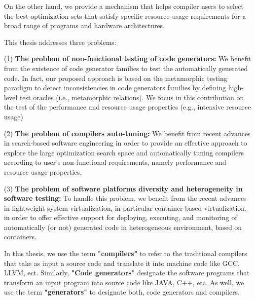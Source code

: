On the other hand, we provide a mechanism that helps compiler users to select the best optimization sets that satisfy specific resource usage requirements for a broad range of programs and hardware architectures.

This thesis addresses three problems: 
	
	(1) \textbf{The problem of non-functional testing of code generators:} We benefit from the existence of code generator families to test the automatically generated code. In fact, our proposed approach is based on the metamorphic testing paradigm to detect inconsistencies in code generators families by defining high-level test oracles (i.e., metamorphic relations). We focus in this contribution on the test of the performance and resource usage properties (e.g., intensive resource usage)
	
	(2) \textbf{The problem of compilers auto-tuning:}  We benefit from recent advances in search-based software engineering in order to provide an effective approach to explore the large optimization search space and automatically tuning compilers according to user's non-functional requirements, namely performance and resource usage properties.

	(3) \textbf{The problem of software platforms diversity and heterogeneity in software testing:} To handle this problem, we benefit from the recent advances in lightweight system virtualization, in particular container-based virtualization, in order to offer effective support for deploying, executing, and monitoring of automatically (or not) generated code in heterogeneous environment, based on containers.

In this thesis, we use the term \textbf{"compilers"} to refer to the traditional compilers that take as input a source code and translate it into machine code like GCC, LLVM, ect. Similarly, \textbf{"Code generators"} designate the software programs that transform an input program into source code like JAVA, C++, etc. As well, we use the term \textbf{"generators"} to designate both, code generators and compilers. 

